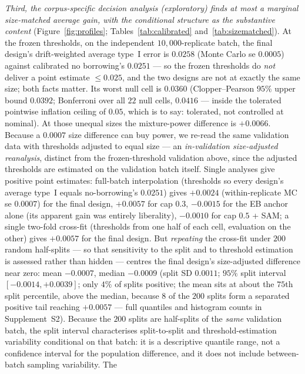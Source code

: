\documentclass[11pt]{article}
\begin{document}
\emph{Third, the corpus-specific decision analysis (exploratory) finds at
most a marginal size-matched average gain, with the conditional structure
as the substantive content} (Figure~\ref{fig:profiles};
Tables~\ref{tab:calibrated} and~\ref{tab:sizematched}). At the frozen
thresholds, on the independent $10{,}000$-replicate batch, the final
design's drift-weighted average type~I error is $0.0258$ (Monte Carlo se
$0.0005$) against calibrated no borrowing's $0.0251$ --- so the frozen
thresholds do \emph{not} deliver a point estimate $\le 0.025$, and the two
designs are not at exactly the same size; both facts matter. Its worst
null cell is $0.0360$ (Clopper--Pearson $95\%$ upper bound $0.0392$;
Bonferroni over all $22$ null cells, $0.0416$ --- inside the tolerated
pointwise inflation ceiling of $0.05$, which is to say: tolerated, not
controlled at nominal). At those unequal sizes the mixture-power
difference is $+0.0066$. Because a $0.0007$ size difference can buy power,
we re-read the same validation data with thresholds adjusted to equal
size --- an \emph{in-validation size-adjusted reanalysis}, distinct from
the frozen-threshold validation above, since the adjusted thresholds are
estimated on the validation batch itself. Single analyses give positive
point estimates: full-batch interpolation (thresholds so every design's
average type~I equals no-borrowing's $0.0251$) gives $+0.0024$
(within-replicate MC se $0.0007$) for the final design, $+0.0057$ for cap
$0.3$, $-0.0015$ for the EB anchor alone (its apparent gain was entirely
liberality), $-0.0010$ for cap $0.5$ + SAM; a single two-fold cross-fit
(thresholds from one half of each cell, evaluation on the other) gives
$+0.0057$ for the final design. But \emph{repeating} the cross-fit under
$200$ random half-splits --- so that sensitivity to the split and to
threshold estimation is assessed rather than hidden --- centres the final
design's size-adjusted difference near zero: mean $-0.0007$, median
$-0.0009$ (split SD $0.0011$; $95\%$ split interval
$[-0.0014, +0.0039]$; only $4\%$ of splits positive; the mean sits at
about the $75$th split percentile, above the median, because $8$ of the
$200$ splits form a separated positive tail reaching $+0.0057$ --- full
quantiles and histogram counts in Supplement~S2). Because the $200$
splits are half-splits of the \emph{same} validation batch, the split
interval characterises split-to-split and threshold-estimation
variability conditional on that batch: it is a descriptive quantile
range, not a confidence interval for the population difference, and it
does not include between-batch sampling variability. The
\end{document}
